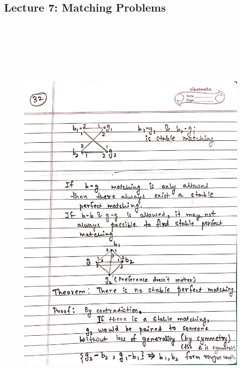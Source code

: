 \newpage
{\color{black} \subsection*{Lecture 7: Matching Problems}}
\begin{figure}[H]
    \centering
    \includegraphics[width=16cm, height=21cm]{"./MIT-6.042J/MIT-6042J-032"}
\end{figure}

